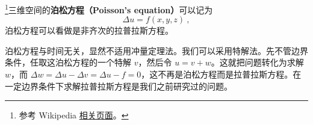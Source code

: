 

\footnote{参考 Wikipedia \href{https://en.wikipedia.org/wiki/Poisson's_equation}{相关页面}。}三维空间的\textbf{泊松方程（Poisson's equation）}可以记为
\begin{equation}
\Delta u=f(x, y, z)~,
\end{equation}
泊松方程可以看做是非齐次的拉普拉斯方程。

泊松方程与时间无关，显然不适用冲量定理法。我们可以采用特解法。先不管边界条件，任取这泊松方程的一个特解 $v$，然后令 $u=v+w$。这就把问题转化为求解 $w$，而 $\Delta w=\Delta u-\Delta v=\Delta u-f=0$，这不再是泊松方程而是拉普拉斯方程。在一定边界条件下求解拉普拉斯方程是我们之前研究过的问题。

